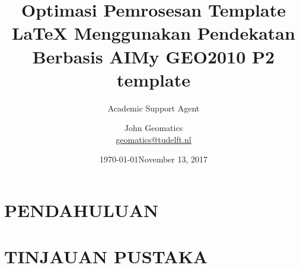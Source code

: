 \documentclass{scrartcl}
\title{Optimasi Pemrosesan Template LaTeX Menggunakan Pendekatan Berbasis AI}
\author{Academic Support Agent}
\date{\today}
\begin{document}
\maketitle

\begin{abstract}

\end{abstract}

\chapter{PENDAHULUAN}


\chapter{TINJAUAN PUSTAKA}



\usepackage{graphicx}
\usepackage[utf8]{inputenc} %
\usepackage{amsmath,amssymb,amsthm} 
\usepackage[round]{natbib}
\usepackage{url}
\usepackage{xspace}
\usepackage[left=20mm,top=20mm]{geometry}
\usepackage{algorithmic}
\usepackage{subcaption}
\usepackage{mathpazo}
\usepackage{booktabs}
\usepackage{hyperref}


\newcommand{\ie}{i.e.}
\newcommand{\eg}{e.g.}
\newcommand{\reffig}[1]{Figure~\ref{#1}}
\newcommand{\refsec}[1]{Section~\ref{#1}}

\setcapindent{1em} %

\renewcommand{\algorithmicrequire}{\textbf{Input:}}
\renewcommand{\algorithmicensure}{\textbf{Output:}}


\title{My GEO2010 P2 template}
\author{John Geomatics\\ \url{geomatics@tudelft.nl}}
\date{November 13, 2017}
\end{document}

